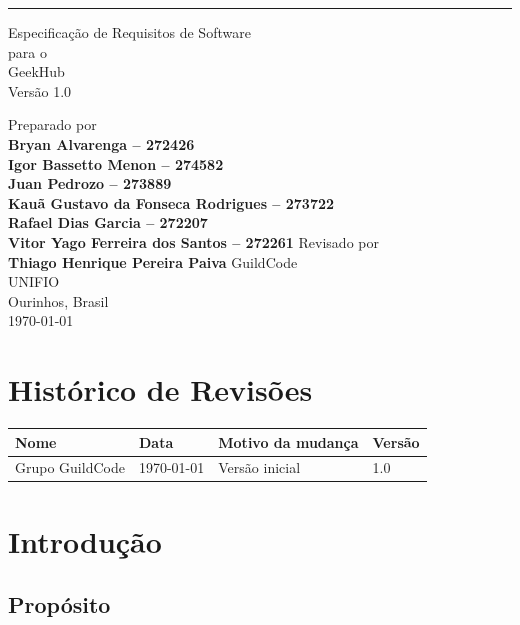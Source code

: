 \documentclass{scrreprt}
\def\myauthorname{Bryan Alvarenga -- 272426 \\
	Igor Bassetto Menon -- 274582 \\
	Juan Pedrozo -- 273889 \\
	Kauã Gustavo da Fonseca Rodrigues -- 273722 \\
	Rafael Dias Garcia -- 272207 \\
	Vitor Yago Ferreira dos Santos -- 272261}
\def\myorganization{GuildCode\\UNIFIO\\Ourinhos, Brasil}
\def\myreviewer{Thiago Henrique Pereira Paiva}
\def\mysubject{GeekHub}
\def\myversion{1.0}
\begin{document}
\thispagestyle{empty}

\begin{flushright}
    \rule{\textwidth}{5pt}\vskip 0.8cm
    \begin{bfseries}
        \LARGE{Especificação de Requisitos de Software}\\
        \vspace{0.8cm}
        para o \\
        \vspace{0.8cm}
        \Huge{\mysubject}\\
        \vspace{1.9cm}
        \Large{Versão \myversion}\\
    \end{bfseries}
        \vfill
        \large 	Preparado por\\
        \vspace{0.25cm}
        \LARGE \textbf{\myauthorname}
        \vfill
        \large 	Revisado por\\
        \vspace{0.25cm}
        \LARGE \textbf{\myreviewer}
        \vfill
        \large \myorganization\\
        \vspace{0.5cm}
	    \today\\
\end{flushright}

\chapter*{Histórico de Revisões}
\setcounter{page}{1}
\begin{center}
	\begin{tabular}{@{} p{3cm} l p{5.4cm} l @{}}
		\toprule
		\textbf{Nome}           & \textbf{Data} & \textbf{Motivo da mudança} & \textbf{Versão} \\
		\midrule
		Grupo GuildCode         & \today        & Versão inicial             & 1.0             \\
		\bottomrule
	\end{tabular}
\end{center}

\tableofcontents

\chapter{Introdução}

\section{Propósito}
\end{document}
